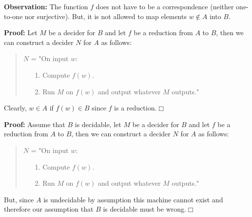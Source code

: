 \documentclass[a4paper,blends,pdf,colorBG,slideColor]{prosper}
\begin{document}
{\bf Observation:} The function $f$ does not have to be a correspondence (neither one-to-one nor 
surjective).  But, it is not allowed to map elements $w\not\in A$ into $B$.
\es


{\bf Proof:} Let $M$ be a decider for $B$ and let $f$ be a reduction from $A$ to $B$,
then we can construct a decider $N$ for $A$ as follows:

\begin{quote}
$N$ = "On input $w$:
\begin{enumerate}
\item[1.] Compute $f(w)$.
\item[2.] Run $M$ on $f(w)$ and output whatever $M$ outputs."
\end{enumerate}
\end{quote}

Clearly, $w \in A$ if $f(w) \in B$ since $f$ is a reduction.$\Box$
\es



{\bf Proof:} Assume that $B$ is decidable, let $M$ be a decider for $B$ and let $f$ be a reduction from $A$ to $B$,
then we can construct a decider $N$ for $A$ as follows:

\begin{quote}
$N$ = "On input $w$:
\begin{enumerate}
\item[1.] Compute $f(w)$.
\item[2.] Run $M$ on $f(w)$ and output whatever $M$ outputs."
\end{enumerate}
\end{quote}

But, since $A$ is undecidable by assumption this machine cannot exist and therefore
our assumption that $B$ is decidable must be wrong.$\Box$
\es
\end{document}
